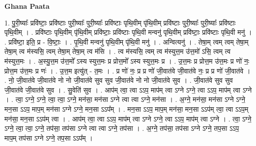 \documentclass[17pt]{extarticle}
\begin{document}
\textbf{Ghana Paata } \newline

1. पु॒री॒ष्याः᳚ प्रवि॑ष्टाः॒ प्रवि॑ष्टाः पुरी॒ष्याः᳚ पुरी॒ष्याः᳚ प्रवि॑ष्टाः पृथि॒वीम् पृ॑थि॒वीम् प्रवि॑ष्टाः पुरी॒ष्याः᳚ पुरी॒ष्याः᳚ प्रवि॑ष्टाः पृथि॒वीम् । . प्रवि॑ष्टाः पृथि॒वीम् पृ॑थि॒वीम् प्रवि॑ष्टाः॒ प्रवि॑ष्टाः पृथि॒वी मन्वनु॑ पृथि॒वीम् प्रवि॑ष्टाः॒ प्रवि॑ष्टाः पृथि॒वी मनु॑ । . प्रवि॑ष्टा॒ इति॒ प्र - वि॒ष्टाः॒ । . पृ॒थि॒वी मन्वनु॑ पृथि॒वीम् पृ॑थि॒वी मनु॑ । . अन्वित्यनु॑ । . तेषा॒म् त्वम् त्वम् तेषा॒म् तेषा॒म् त्व म॑स्यसि॒ त्वम् तेषा॒म् तेषा॒म् त्व म॑सि । . त्व म॑स्यसि॒ त्वम् त्व म॑स्युत्त॒म उ॑त्त॒मो॑ ऽसि॒ त्वम् त्व म॑स्युत्त॒मः । . अ॒स्यु॒त्त॒म उ॑त्त॒मो᳚ ऽस्य स्युत्त॒मः प्र प्रोत्त॒मो᳚ ऽस्य स्युत्त॒मः प्र । . उ॒त्त॒मः प्र प्रोत्त॒म उ॑त्त॒मः प्र णो॑ नः॒ प्रोत्त॒म उ॑त्त॒मः प्र णः॑ । . उ॒त्त॒म इत्यु॑त् - त॒मः । . प्र णो॑ नः॒ प्र प्र णो॑ जी॒वात॑वे जी॒वात॑वे नः॒ प्र प्र णो॑ जी॒वात॑वे । . नो॒ जी॒वात॑वे जी॒वात॑वे नो नो जी॒वात॑वे सुव सुव जी॒वात॑वे नो नो जी॒वात॑वे सुव । . जी॒वात॑वे सुव सुव जी॒वात॑वे जी॒वात॑वे सुव । . सु॒वेति॑ सुव । . आप॑म् त्वा॒ त्वा ऽऽप॒ माप॑म् त्वा ऽग्ने ऽग्ने॒ त्वा ऽऽप॒ माप॑म् त्वा ऽग्ने । . त्वा॒ ऽग्ने॒ ऽग्ने॒ त्वा॒ त्वा॒ ऽग्ने॒ मन॑सा॒ मन॑सा ऽग्ने त्वा त्वा ऽग्ने॒ मन॑सा । . अ॒ग्ने॒ मन॑सा॒ मन॑सा ऽग्ने ऽग्ने॒ मन॒सा ऽऽप॒ माप॒म् मन॑सा ऽग्ने ऽग्ने॒ मन॒सा ऽऽप᳚म् । . मन॒सा ऽऽप॒ माप॒म् मन॑सा॒ मन॒सा ऽऽप॑म् त्वा॒ त्वा ऽऽप॒म् मन॑सा॒ मन॒सा ऽऽप॑म् त्वा । . आप॑म् त्वा॒ त्वा ऽऽप॒ माप॑म् त्वा ऽग्ने ऽग्ने॒ त्वा ऽऽप॒ माप॑म् त्वा ऽग्ने । . त्वा॒ ऽग्ने॒ ऽग्ने॒ त्वा॒ त्वा॒ ऽग्ने॒ तप॑सा॒ तप॑सा ऽग्ने त्वा त्वा ऽग्ने॒ तप॑सा । . अ॒ग्ने॒ तप॑सा॒ तप॑सा ऽग्ने ऽग्ने॒ तप॒सा ऽऽप॒ माप॒म् तप॑सा ऽग्ने ऽग्ने॒ तप॒सा ऽऽप᳚म् । \newline
\end{document}
